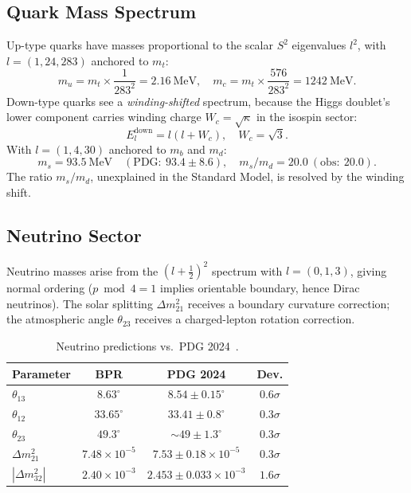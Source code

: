 \documentclass[prd,twocolumn,amsmath,amssymb]{revtex4-2}
\begin{document}
\subsection{Quark Mass Spectrum}
\label{sec:quarks}

Up-type quarks have masses proportional to the scalar $S^2$ eigenvalues $l^2$, with $l = (1, 24, 283)$ anchored to $m_t$:
\begin{equation}
m_u = m_t \times \frac{1}{283^2} = 2.16~\mathrm{MeV},\quad m_c = m_t \times \frac{576}{283^2} = 1242~\mathrm{MeV}.
\end{equation}
Down-type quarks see a \textit{winding-shifted} spectrum, because the Higgs doublet's lower component carries winding charge $W_c = \sqrt{\kappa}$ in the isospin sector:
\begin{equation}\label{eq:down}
E_l^{\mathrm{down}} = l(l + W_c),\quad W_c = \sqrt{3}.
\end{equation}
With $l = (1, 4, 30)$ anchored to $m_b$ and $m_d$:
\begin{equation}
m_s = 93.5~\mathrm{MeV}\quad(\mathrm{PDG:}~93.4 \pm 8.6),\quad m_s/m_d = 20.0~(\mathrm{obs:}~20.0).
\end{equation}
The ratio $m_s/m_d$, unexplained in the Standard Model, is resolved by the winding shift.

\subsection{Neutrino Sector}
\label{sec:neutrinos}

Neutrino masses arise from the $(l+\tfrac{1}{2})^2$ spectrum with $l = (0, 1, 3)$, giving normal ordering ($p \bmod 4 = 1$ implies orientable boundary, hence Dirac neutrinos). The solar splitting $\Delta m^2_{21}$ receives a boundary curvature correction; the atmospheric angle $\theta_{23}$ receives a charged-lepton rotation correction.

\begin{table}[t]
\centering
\caption{Neutrino predictions vs.\ PDG 2024~\cite{PDG2024}.}
\label{tab:nu}
\begin{tabular}{lccc}
\hline
Parameter & BPR & PDG 2024 & Dev.\\
\hline
$\theta_{13}$ & $8.63^\circ$ & $8.54 \pm 0.15^\circ$ & $0.6\sigma$ \\
$\theta_{12}$ & $33.65^\circ$ & $33.41 \pm 0.8^\circ$ & $0.3\sigma$ \\
$\theta_{23}$ & $49.3^\circ$ & ${\sim}49 \pm 1.3^\circ$ & $0.3\sigma$ \\
$\Delta m^2_{21}$ & $7.48{\times}10^{-5}$ & $7.53 \pm 0.18 {\times}10^{-5}$ & $0.3\sigma$ \\
$|\Delta m^2_{32}|$ & $2.40{\times}10^{-3}$ & $2.453 \pm 0.033 {\times}10^{-3}$ & $1.6\sigma$ \\
\hline
\end{tabular}
\end{table}
\end{document}
